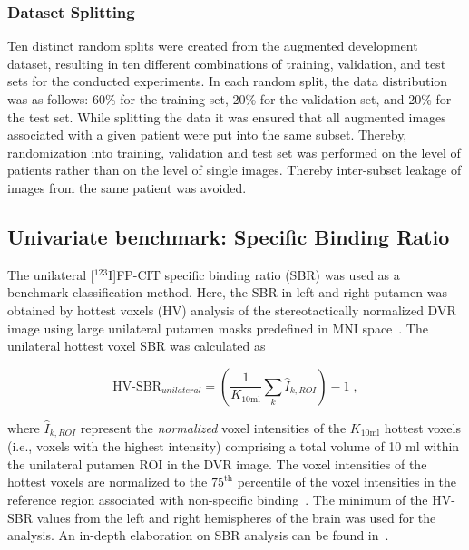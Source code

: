 \subsubsection{Dataset Splitting}
\label{subsec:split}

Ten distinct random splits were created from the augmented development dataset, 
resulting in ten different combinations of training, validation, and test sets for the conducted experiments.
In each random split, the data distribution was as follows: 
60\% for the training set, 20\% for the validation set, and 20\% for the test set.
While splitting the data it was ensured that all augmented images associated with a given patient were put 
into the same subset.
Thereby, randomization into training, validation and test set was performed 
on the level of patients rather than on the level of single images.
Thereby inter-subset leakage of images from the same patient was avoided.

\subsection{Univariate benchmark: Specific Binding Ratio}
\label{subsec:sbr}

The unilateral [$^{123}$I]FP-CIT specific binding ratio (SBR) was used as a benchmark classification method.
Here, the SBR in left and right putamen was obtained by hottest voxels (HV) analysis of the stereotactically normalized 
DVR image using large unilateral putamen masks predefined in MNI space~\citep{Wenzel2019}.
The unilateral hottest voxel SBR was calculated as

\begin{equation}\label{eq:sbr}
  \text{HV-SBR}_{unilateral} = \left( \frac{1}{K_{\text{10ml}}} \sum_{k} \hat{I}_{k, ROI} \right) - 1 \;,
\end{equation}

where $\hat{I}_{k, ROI}$ represent the \textit{normalized} voxel intensities of the $K_{\text{10ml}}$
hottest voxels (i.e., voxels with the highest intensity) comprising a total volume of 10 ml 
within the unilateral putamen ROI in the DVR image.
The voxel intensities of the hottest voxels are normalized to the $75^{\text{th}}$ percentile of the voxel intensities 
in the reference region associated with non-specific binding~\citep{Wenzel2019}.
The minimum of the HV-SBR values from the left and right hemispheres of the brain was used for the analysis.
An in-depth elaboration on SBR analysis can be found in~\cite{Wenzel2019}.

